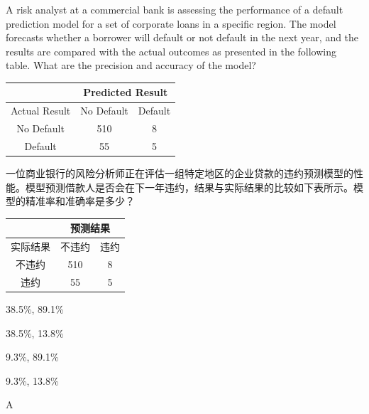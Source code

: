 \documentclass{article}
\newcounter{question} %
\begin{document}
\begin{question}
    A risk analyst at a commercial bank is assessing the performance of a default prediction model for a set of corporate loans in a specific region. The model forecasts whether a borrower will default or not default in the next year, and the results are compared with the actual outcomes as presented in the following table. What are the precision and accuracy of the model?
    \begin{center}
    \begin{tabular}{|c|c|c|}
    \hline
        & \multicolumn{2}{|c|}{Predicted Result} \\ \hline
    Actual Result & No Default & Default \\ \hline
    No Default & 510 & 8 \\ \hline
    Default & 55 & 5 \\ \hline
    \end{tabular}
    \end{center}
    一位商业银行的风险分析师正在评估一组特定地区的企业贷款的违约预测模型的性能。模型预测借款人是否会在下一年违约，结果与实际结果的比较如下表所示。模型的精准率和准确率是多少？
    \begin{center}
        \begin{tabular}{|c|c|c|}
        \hline
            & \multicolumn{2}{|c|}{预测结果} \\ \hline
        实际结果 & 不违约 & 违约 \\ \hline
        不违约 & 510 & 8 \\ \hline
        违约 & 55 & 5 \\ \hline
        \end{tabular}
        \end{center}
    \end{question}
    
    \begin{choices}
        \item 38.5\%, 89.1\%
        \item 38.5\%, 13.8\%
        \item 9.3\%, 89.1\%
        \item 9.3\%, 13.8\%
    \end{choices}
    
    \begin{correctanswer}
        A
    \end{correctanswer}
    
\end{document}
